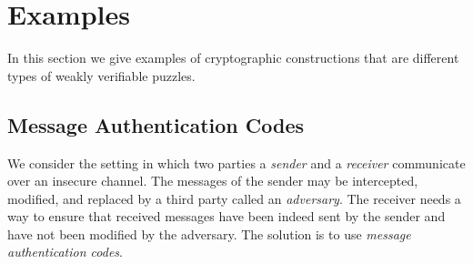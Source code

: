 \section{Examples}
\label{section:wvp_examples}
In this section we give examples of cryptographic constructions that are different types of weakly verifiable puzzles.

\subsection{Message Authentication Codes}
We consider the setting in which two parties a \textit{sender} and a \textit{receiver} communicate over an insecure channel.
The messages of the sender may be intercepted, modified, and replaced by a third party called an \textit{adversary}.
The receiver needs a way to ensure that received messages have been indeed sent by the sender and have not been modified by the adversary.
The solution is to use \textit{message authentication codes}.


